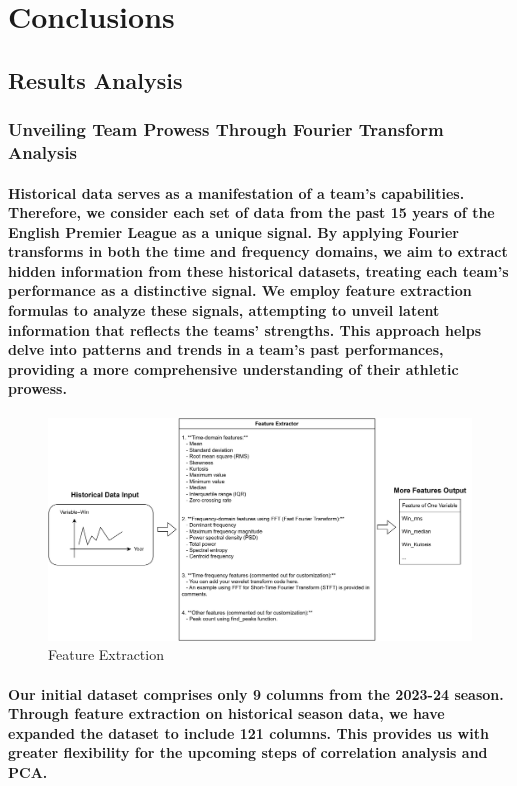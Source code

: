 \section{Conclusions}
% 
% 
\subsection{Results Analysis}
\subsubsection*{\textbf{Unveiling Team Prowess Through Fourier Transform Analysis}}
\paragraph{Historical data serves as a manifestation of a team's capabilities. Therefore, we consider each set of data from the past 15 years of the English Premier League as a unique signal. By applying Fourier transforms in both the time and frequency domains, we aim to extract hidden information from these historical datasets, treating each team's performance as a distinctive signal. We employ feature extraction formulas to analyze these signals, attempting to unveil latent information that reflects the teams' strengths. This approach helps delve into patterns and trends in a team's past performances, providing a more comprehensive understanding of their athletic prowess.}
% 
% 
% 
\begin{figure}[H]
    \includegraphics[width=\textwidth]{pic/feature.png}
    \caption{Feature Extraction}
\end{figure}
% 
% 
% 
% 
\paragraph{Our initial dataset comprises only 9 columns from the 2023-24 season. Through feature extraction on historical season data, we have expanded the dataset to include 121 columns. This provides us with greater flexibility for the upcoming steps of correlation analysis and PCA.}
% 
% 
% 
% 
% 
% 
% 
% 
% 
% 
% 
% 
